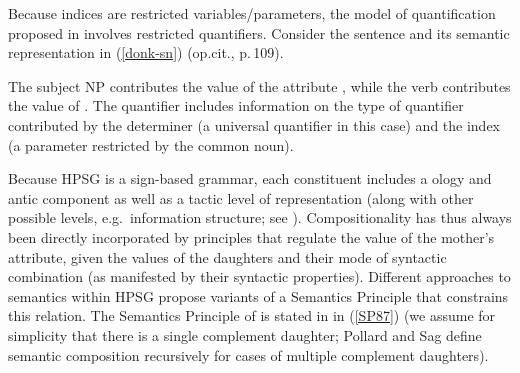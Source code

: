 \documentclass[output=paper
	        ,collection
	        ,collectionchapter
 	        ,biblatex
                ,babelshorthands
                ,newtxmath
                ,draftmode
                ,colorlinks, citecolor=brown
]{langscibook}
\begin{document}
\begin{exe}
\ex\label{donkey}
\end{exe} 

Because indices are restricted variables/parameters,  the model of quantification proposed in \citet[Chapter 4]{PollardandSag1987} involves restricted quantifiers. Consider the sentence  and its semantic representation in (\ref{donk-sn}) (op.cit., p.\,109).

\begin{exe}
\ex\label{donk-sn}


\end{exe}

The subject NP contributes the value of the attribute , while the verb contributes the value of . The quantifier includes information on the type of quantifier contributed by the determiner (a universal quantifier in this case) and the index (a parameter restricted by the common noun).

Because HPSG is a sign-based grammar, each constituent includes a ology and antic component as well as a tactic level of representation (along with other possible levels, e.g.\ information structure; see ). Compositionality has thus always been directly incorporated by principles that regulate the value of the mother's  attribute, given the  values of the daughters and their mode of syntactic combination (as manifested by their syntactic properties). Different approaches to semantics within HPSG  propose variants of a Semantics Principle that constrains this relation. The Semantics Principle of \citet[109]{PollardandSag1987} is stated in  in (\ref{SP87}) (we assume for simplicity that there is a single complement daughter; Pollard and Sag define semantic composition recursively for cases of multiple complement daughters).
\end{document}
